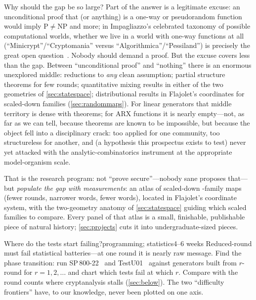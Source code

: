 Why should the gap be so large? Part of the answer is a legitimate
excuse: an unconditional proof that \SHA{} (or anything) is a one-way or
pseudorandom function would imply $\mathrm{P} \ne \mathrm{NP}$ and more;
in Impagliazzo's celebrated taxonomy of possible computational worlds,
whether we live in a world with one-way functions at all
(``Minicrypt''/``Cryptomania'' versus ``Algorithmica''/``Pessiland'')
is precisely the great open question~\citep{Impagliazzo1995}. Nobody
should demand a proof. But the excuse covers less than the gap. Between
``unconditional proof'' and ``nothing'' there is an enormous unexplored
middle: reductions to \emph{any} clean assumption; partial structure
theorems for few rounds; quantitative mixing results in either of the two
geometries of \cref{sec:statespace}; distributional results in Flajolet's
coordinates for scaled-down families (\cref{sec:randommaps}). For linear
generators that middle territory is dense with theorems; for ARX
functions it is nearly empty---not, as far as we can tell, because
theorems are known to be impossible, but because the object fell into a
disciplinary crack: too applied for one community, too structureless for
another, and (a hypothesis this prospectus exists to test) never yet
attacked with the analytic-combinatorics instrument at the appropriate
model-organism scale.

That is the research program: not ``prove \SHA{} secure''---nobody sane
proposes that---but \emph{populate the gap with measurements}: an atlas
of scaled-down \SHA{}-family maps (fewer rounds, narrower words, fewer
words), located in Flajolet's coordinate system, with the two-geometry
anatomy of \cref{sec:statespace} guiding which scaled families to
compare. Every panel of that atlas is a small, finishable, publishable
piece of natural history; \cref{sec:projects} cuts it into
undergraduate-sized pieces.

\begin{project}{Where do the tests start failing?}{programming;
  statistics}{4--6 weeks}
  Reduced-round \SHA{} must fail statistical batteries---at one round it
  is nearly raw message. Find the phase transition: run
  SP\,800-22~\citep{NIST2010} and TestU01~\citep{LEcuyerSimard2007}
  against generators built from $r$-round \SHA{} for $r = 1, 2, \dots$
  and chart which tests fail at which $r$. Compare with the round counts
  where cryptanalysis stalls (\cref{sec:below}). The two ``difficulty
  frontiers'' have, to our knowledge, never been plotted on one axis.
\end{project}

